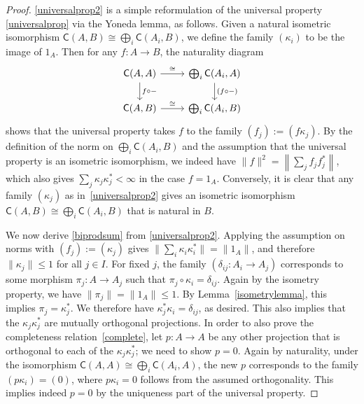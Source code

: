\documentclass[reqno,T1,11pt]{amsproc}
\newcommand{\cat}[1]{\mathsf{#1}}		%
\newcommand{\id}[1]{1_{#1}}			%
\theoremstyle{plain}
\theoremstyle{remark}
\numberwithin{equation}{section}
\begin{document}
\begin{proof}
\ref{universalprop2} is a simple reformulation of the universal property \ref{universalprop} via the Yoneda lemma, as follows. Given a natural isometric isomorphism $\cat{C}(A,B) \cong \bigoplus_i \cat{C}(A_i,B)$, we define the family $(\kappa_i)$ to be the image of $\id{A}$. Then for any $f : A \to B$, the naturality diagram
\[\begin{tikzcd}
	\cat{C}(A,A) \ar{r}{\cong} \ar{d}{f\circ -} & \bigoplus_i \cat{C}(A_i,A) \ar{d}{(f\circ -)} \\
	\cat{C}(A,B) \ar{r}{\cong} & \bigoplus_i \cat{C}(A_i,B)
\end{tikzcd}\]
shows that the universal property takes $f$ to the family $(f_j) := (f\kappa_j)$. By the definition of the norm on $\bigoplus_i \cat{C}(A_i,B)$ and the assumption that the universal property is an isometric isomorphism, we indeed have $\| f \|^2 = \left\| \sum_j f_j f_j^* \right\|$, which also gives $\sum_j \kappa_j \kappa_j^* < \infty$ in the case $f = \id{A}$. Conversely, it is clear that any family $(\kappa_j)$ as in~\ref{universalprop2} gives an isometric isomorphism $\cat{C}(A,B) \cong \bigoplus_i \cat{C}(A_i,B)$ that is natural in $B$.

We now derive \ref{biprodsum} from \ref{universalprop2}. Applying the assumption on norms with $(f_j) := (\kappa_j)$ gives $\| \sum_i \kappa_i \kappa_i^* \| = \| \id{A} \|$, and therefore $\| \kappa_j \| \leq 1$ for all $j\in I$. For fixed $j$, the family $(\delta_{ij} : A_i \to A_j)$ corresponds to some morphism $\pi_j : A \to A_j$ such that $\pi_j\circ\kappa_i = \delta_{ij}$. Again by the isometry property, we have $\| \pi_j \| = \| \id{A} \| \leq 1$. By Lemma~\ref{isometrylemma}, this implies $\pi_j = \kappa_j^*$. We therefore have $\kappa_j^*\kappa_i = \delta_{ij}$, as desired. This also implies that the $\kappa_j \kappa_j^*$ are mutually orthogonal projections. In order to also prove the completeness relation~\eqref{complete}, let $p : A\to A$ be any other projection that is orthogonal to each of the $\kappa_j \kappa_j^*$; we need to show $p = 0$. Again by naturality, under the isomorphism $\cat{C}(A,A) \cong \bigoplus_i \cat{C}(A_i,A)$, the new $p$ corresponds to the family $(p\kappa_i) = (0)$, where $p\kappa_i = 0$ follows from the assumed orthogonality. This implies indeed $p=0$ by the uniqueness part of the universal property.


\end{proof}
\end{document}
